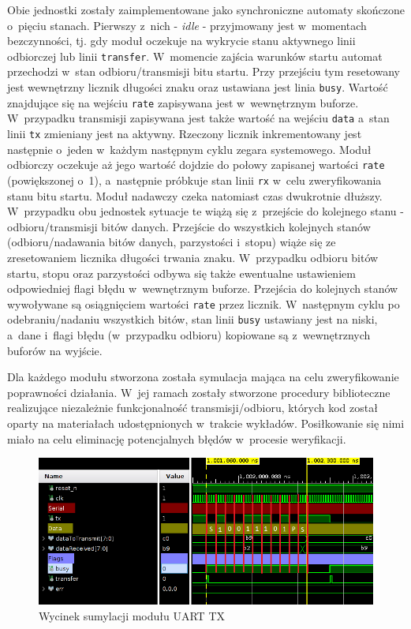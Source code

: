Obie jednostki zostały zaimplementowane jako synchroniczne automaty skończone o~pięciu stanach. Pierwszy z~nich - \textit{idle} - przyjmowany jest w~momentach bezczynności, tj. gdy moduł oczekuje na wykrycie stanu aktywnego linii odbiorczej lub linii \verb|transfer|. W~momencie zajścia warunków startu automat przechodzi w~stan odbioru/transmisji bitu startu. Przy przejściu tym resetowany jest wewnętrzny licznik długości znaku oraz ustawiana jest linia \verb|busy|. Wartość znajdujące się na wejściu \verb|rate| zapisywana jest w~wewnętrznym buforze. W~przypadku transmisji zapisywana jest także wartość na wejściu \verb|data| a~stan linii \verb|tx| zmieniany jest na aktywny. Rzeczony licznik inkrementowany jest następnie o~jeden w~każdym następnym cyklu zegara systemowego. Moduł odbiorczy oczekuje aż jego wartość dojdzie do połowy zapisanej wartości \verb|rate| (powiększonej o~1), a~następnie próbkuje stan linii \verb|rx| w~celu zweryfikowania stanu bitu startu. Moduł nadawczy czeka natomiast czas dwukrotnie dłuższy. W~przypadku obu jednostek sytuacje te wiążą się z~przejście do kolejnego stanu - odbioru/transmisji bitów danych. Przejście do wszystkich kolejnych stanów (odbioru/nadawania bitów danych, parzystości i~stopu) wiąże się ze zresetowaniem licznika długości trwania znaku. W~przypadku odbioru bitów startu, stopu oraz parzystości odbywa się także ewentualne ustawieniem odpowiedniej flagi błędu w~wewnętrznym buforze. Przejścia do kolejnych stanów wywoływane są osiągnięciem wartości \verb|rate| przez licznik. W~następnym cyklu po odebraniu/nadaniu wszystkich bitów, stan linii \verb|busy| ustawiany jest na niski, a~dane i~flagi błędu (w~przypadku odbioru) kopiowane są z~wewnętrznych buforów na wyjście.

Dla każdego modułu stworzona została symulacja mająca na celu zweryfikowanie poprawności działania. W~jej ramach zostały stworzone procedury biblioteczne realizujące niezależnie funkcjonalność transmisji/odbioru, których kod został oparty na materiałach udostępnionych w~trakcie wykładów. Posiłkowanie się nimi miało na celu eliminację potencjalnych błędów w~procesie weryfikacji.

\vspace{0.5cm}
\begin{figure}[ht]
    \centering
    \includegraphics[scale=0.7]{img/sim/communication/uart_tx_sim.png}
    \captionsetup{format=plain,justification=centering}
    \caption{Wycinek sumylacji modułu UART TX}
    \label{sim-uart-tx}
\end{figure}
\vspace{0.5cm}

